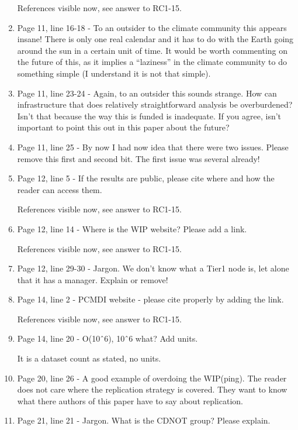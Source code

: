 \documentclass[gmd,manuscript]{copernicus}
\newenvironment{answer}{\color{blue}}{}
\begin{document}
\begin{enumerate}[label=RC3-\arabic*,leftmargin=*]
  \begin{answer}
    References visible now, see answer to RC1-15.
  \end{answer}
\item Page 11, line 16-18 - To an outsider to the climate community
  this appears insane! There is only one real calendar and it has to
  do with the Earth going around the sun in a certain unit of time. It
  would be worth commenting on the future of this, as it implies a
  “laziness” in the climate community to do something simple (I
  understand it is not that simple).
\item Page 11, line 23-24 - Again, to an outsider this sounds strange.
  How can infrastructure that does relatively straightforward analysis
  be overburdened? Isn’t that because the way this is funded is
  inadequate. If you agree, isn’t important to point this out in this
  paper about the future?
\item Page 11, line 25 - By now I had now idea that there were two
  issues. Please remove this first and second bit. The first issue was
  several already!
\item Page 12, line 5 - If the results are public, please cite where
  and how the reader can access them.

  \begin{answer}
    References visible now, see answer to RC1-15.
  \end{answer}
\item Page 12, line 14 - Where is the WIP website? Please add a link.

  \begin{answer}
    References visible now, see answer to RC1-15.
  \end{answer}
\item Page 12, line 29-30 - Jargon. We don’t know what a Tier1 node
  is, let alone that it has a manager. Explain or remove!
\item Page 14, line 2 - PCMDI website - please cite properly by adding
  the link.

  \begin{answer}
    References visible now, see answer to RC1-15.
  \end{answer}
\item Page 14, line 20 - O(10ˆ6), 10ˆ6 what? Add units.

  \begin{answer}
    It is a dataset count as stated, no units.
  \end{answer}
\item Page 20, line 26 - A good example of overdoing the WIP(ping).
  The reader does not care where the replication strategy is covered.
  They want to know what there authors of this paper have to say about
  replication.
\item Page 21, line 21 - Jargon. What is the CDNOT group? Please
  explain.


\end{enumerate}
\end{document}
